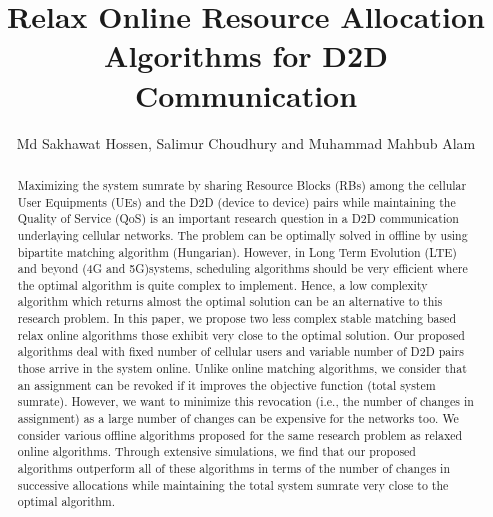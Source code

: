\documentclass[times]{dacauth}
\begin{document}

\title{Relax Online Resource Allocation Algorithms for D2D Communication}

\author{Md Sakhawat Hossen, Salimur Choudhury and Muhammad Mahbub Alam}

\address{Department of Computer Science and Engineering, IUT, Dhaka, Bangladesh and Department of Mathematics and Computer Science, Algoma University, Sault Ste. Marie, ON, Canada}


\begin{abstract}

\noindent 
Maximizing the system sumrate by sharing Resource Blocks (RBs) among the cellular User Equipments (UEs) and the D2D (device to device) pairs while maintaining the Quality of Service (QoS) is an important research question in a D2D communication underlaying cellular networks. The problem can be optimally solved in offline by using bipartite matching algorithm (Hungarian). However, in Long Term Evolution (LTE) and beyond (4G and 5G)systems, scheduling algorithms should be very efficient where the optimal algorithm is quite complex to implement. Hence, a low complexity algorithm which returns almost the optimal solution can be an alternative to this research problem. In this paper, we propose two less complex stable matching based relax online algorithms those exhibit very close to the optimal solution. Our proposed algorithms deal with fixed number of cellular users and variable number of D2D pairs those arrive in the system online. Unlike online matching algorithms, we consider that an assignment can be revoked if it improves the objective function (total system sumrate). However, we want to minimize this revocation (i.e., the number of changes in assignment) as a large number of changes can be expensive for the networks too. We consider various offline algorithms proposed for the same research problem as relaxed online algorithms. Through extensive simulations, we find that our proposed algorithms outperform all of these algorithms in terms of the number of changes in successive allocations while maintaining the total system sumrate very close to the optimal algorithm.

\end{abstract}

\end{document}
